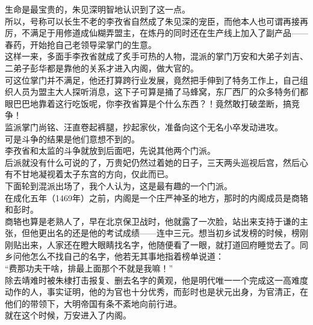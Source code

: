 \begin{multicols}{\theparacolNo}
生命是最宝贵的，朱见深明智地认识到了这一点。\\

所以，号称可以长生不老的李孜省自然成了朱见深的宠臣，而他本人也可谓再接再厉，不满足于用修道成仙糊弄盟主，在炼丹的同时还在生产线上加入了副产品——春药，开始抢自己老领导梁掌门的生意。\\

这样一来，多面手李孜省就成了炙手可热的人物，混派的掌门万安和大弟子刘吉、二弟子彭华都是靠他的关系才进入内阁，做大官的。\\

可这位掌门并不满足，他还打算跨行业发展，竟然把手伸到了特务工作上，自己组织人员为盟主大人探听消息，这下子可算是捅了马蜂窝，东厂西厂的众多特务们都眼巴巴地靠着这行吃饭呢，你李孜省算是个什么东西？！竟然敢打破垄断，搞竞争！\\

监派掌门尚铭、汪直卷起裤腿，抄起家伙，准备向这个无名小卒发动进攻。\\

可是斗争的结果是他们意想不到的。\\

李孜省和太监的斗争就放到后面吧，先说其他两个门派。\\

后派就没有什么可说的了，万贵妃仍然过着她的日子，三天两头巡视后宫，然后心有不甘地凝视着太子东宫的方向，仅此而已。\\

下面轮到混派出场了，我个人认为，这是最有趣的一个门派。\\

在成化五年（1469年）之前，内阁是一个庄严神圣的地方，那时的内阁成员是商辂和彭时。\\

商辂也算是老熟人了，早在北京保卫战时，他就露了一次脸，站出来支持于谦的主张，但他更出名的还是他的考试成绩——连中三元。想当初乡试发榜的时候，榜刚刚贴出来，人家还在瞪大眼睛找名字，他随便看了一眼，就打道回府睡觉去了。同乡问他怎么不找自己的名字，他若无其事地指着榜单说道：\\

“费那功夫干啥，排最上面那个不就是我嘛！”\\

除去靖难时被朱棣打击报复、删去名字的黄观，他是明代唯一一个完成这一高难度动作的人，事实证明，他的为官也十分优秀，而彭时也是状元出身，为官清正，在他们的带领下，大明帝国有条不紊地向前行进。\\

就在这个时候，万安进入了内阁。\\


\end{multicols}
